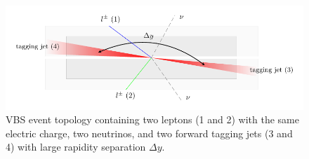 \begin{figure}[htbp]
  \centering
    \includegraphics[width=.95\textwidth]{figs/ssww_13tev/introduction/vbs_event_topology}
  \caption{\ssww VBS event topology containing two leptons (1 and 2) with the same electric charge, two neutrinos, and two forward tagging jets (3 and 4) with large rapidity separation $\Delta y$.}
  \label{fig:ssww13tev_event_topology}
\end{figure}


%
